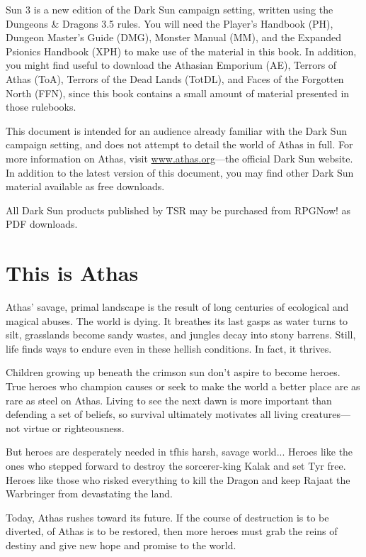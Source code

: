  Sun 3 is a new edition of the {\tableheader Dark Sun} campaign setting, written using the Dungeons \& Dragons 3.5 rules. You will need the Player's Handbook (PH), Dungeon Master's Guide (DMG), Monster Manual (MM), and the Expanded Psionics Handbook (XPH) to make use of the material in this book. In addition, you might find useful to download the Athasian Emporium (AE), Terrors of Athas (ToA), Terrors of the Dead Lands (TotDL), and Faces of the Forgotten North (FFN), since this book contains a small amount of material presented in those rulebooks.

This document is intended for an audience already familiar with the {\tableheader Dark Sun} campaign setting, and does not attempt to detail the world of Athas in full. For more information on Athas, visit \url{www.athas.org}---the official {\tableheader Dark Sun} website. In addition to the latest version of this document, you may find other {\tableheader Dark Sun} material available as free downloads.

All {\tableheader Dark Sun} products published by TSR may be purchased from RPGNow! as PDF downloads.

\section{This is Athas}

Athas' savage, primal landscape is the result of long centuries of ecological and magical abuses. The world is dying. It breathes its last gasps as water turns to silt, grasslands become sandy wastes, and jungles decay into stony barrens. Still, life finds ways to endure even in these hellish conditions. In fact, it thrives.

Children growing up beneath the crimson sun don't aspire to become heroes. True heroes who champion causes or seek to make the world a better place are as rare as steel on Athas. Living to see the next dawn is more important than defending a set of beliefs, so survival ultimately motivates all living creatures---not virtue or righteousness.

But heroes are desperately needed in tfhis harsh, savage world... Heroes like the ones who stepped forward to destroy the sorcerer-king Kalak and set Tyr free. Heroes like those who risked everything to kill the Dragon and keep Rajaat the Warbringer from devastating the land.

Today, Athas rushes toward its future. If the course of destruction is to be diverted, of Athas is to be restored, then more heroes must grab the reins of destiny and give new hope and promise to the world.

